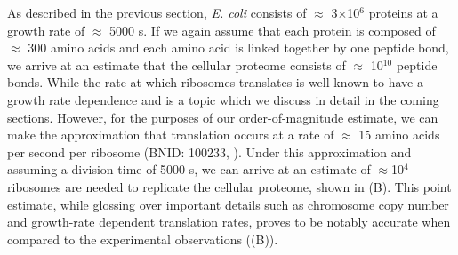 As described in the previous section, \textit{E. coli} consists of $\approx$
3$\times$10$^6$ proteins at a growth rate of $\approx$ 5000 s. If we again
assume that each protein is composed of $\approx$ 300 amino acids and each amino
acid is linked together by one peptide bond, we arrive at an estimate that the
cellular proteome consists of $\approx$ 10$^10$ peptide bonds. While the rate at
which ribosomes translates is well known to have a growth rate dependence
\cite{dai2018} and is a topic which we discuss in detail in the coming sections.
However, for the purposes of our order-of-magnitude estimate, we can make the
approximation that translation occurs at a rate of $\approx$ 15 amino acids per
second per ribosome (BNID: 100233, \cite{milo2010}). Under this approximation
and assuming a division time of 5000 s, we can arrive at an estimate of
$\approx$10$^4$ ribosomes are needed to replicate the cellular proteome, shown
in (B). This point estimate, while glossing over
important details such as chromosome copy number and growth-rate dependent
translation rates, proves to be notably accurate when compared to the
experimental observations ((B)).

\begin{figure}
    \begin{fullwidth}
    \end{fullwidth}
\end{figure}

